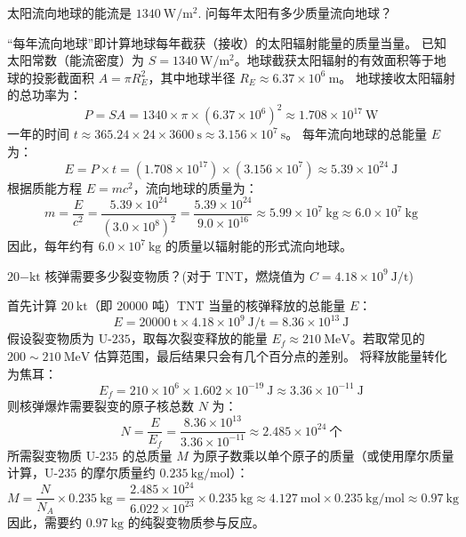 \begin{exercise}\label{ex:9.14}
太阳流向地球的能流是 $1340 \ \mathrm{W/m^2}$. 问每年太阳有多少质量流向地球？
\end{exercise}
\begin{solution}
“每年流向地球”即计算地球每年截获（接收）的太阳辐射能量的质量当量。
已知太阳常数（能流密度）为 $S = 1340 \ \mathrm{W/m^2}$。地球截获太阳辐射的有效面积等于地球的投影截面积 $A = \pi R_E^2$，其中地球半径 $R_E \approx 6.37 \times 10^6 \ \mathrm{m}$。
地球接收太阳辐射的总功率为：
$$ P = S A = 1340 \times \pi \times (6.37 \times 10^6)^2 \approx 1.708 \times 10^{17} \ \mathrm{W} $$
一年的时间 $t \approx 365.24 \times 24 \times 3600 \ \mathrm{s} \approx 3.156 \times 10^7 \ \mathrm{s}$。
每年流向地球的总能量 $E$ 为：
$$ E = P \times t = (1.708 \times 10^{17}) \times (3.156 \times 10^7) \approx 5.39 \times 10^{24} \ \mathrm{J} $$
根据质能方程 $E = mc^2$，流向地球的质量为：
$$ m = \frac{E}{c^2} = \frac{5.39 \times 10^{24}}{(3.0 \times 10^8)^2} = \frac{5.39 \times 10^{24}}{9.0 \times 10^{16}} \approx 5.99 \times 10^7 \ \mathrm{kg} \approx 6.0 \times 10^7 \ \mathrm{kg} $$
因此，每年约有 $6.0 \times 10^7 \ \mathrm{kg}$ 的质量以辐射能的形式流向地球。
\end{solution}

\begin{exercise}\label{ex:9.15}
$20\mathrm{-kt}$ 核弹需要多少裂变物质？(对于 TNT，燃烧值为 $C = 4.18 \times 10^9 \ \mathrm{J/t}$)
\end{exercise}
\begin{solution}
首先计算 $20 \ \mathrm{kt}$（即 $20000$ 吨）TNT 当量的核弹释放的总能量 $E$：
$$ E = 20000 \ \mathrm{t} \times 4.18 \times 10^9 \ \mathrm{J/t} = 8.36 \times 10^{13} \ \mathrm{J} $$
假设裂变物质为 $\mathrm{U\text{-}235}$，取每次裂变释放的能量 $E_f \approx 210 \ \mathrm{MeV}$。若取常见的 $200 \sim 210 \ \mathrm{MeV}$ 估算范围，最后结果只会有几个百分点的差别。
将释放能量转化为焦耳：
$$ E_f = 210 \times 10^6 \times 1.602 \times 10^{-19} \ \mathrm{J} \approx 3.36 \times 10^{-11} \ \mathrm{J} $$
则核弹爆炸需要裂变的原子核总数 $N$ 为：
$$ N = \frac{E}{E_f} = \frac{8.36 \times 10^{13}}{3.36 \times 10^{-11}} \approx 2.485 \times 10^{24} \ \text{个} $$
所需裂变物质 $\mathrm{U\text{-}235}$ 的总质量 $M$ 为原子数乘以单个原子的质量（或使用摩尔质量计算，$\mathrm{U\text{-}235}$ 的摩尔质量约 $0.235 \ \mathrm{kg/mol}$）：
$$ M = \frac{N}{N_A} \times 0.235 \ \mathrm{kg} = \frac{2.485 \times 10^{24}}{6.022 \times 10^{23}} \times 0.235 \ \mathrm{kg} \approx 4.127 \ \mathrm{mol} \times 0.235 \ \mathrm{kg/mol} \approx 0.97 \ \mathrm{kg} $$
因此，需要约 $0.97 \ \mathrm{kg}$ 的纯裂变物质参与反应。
\end{solution}

